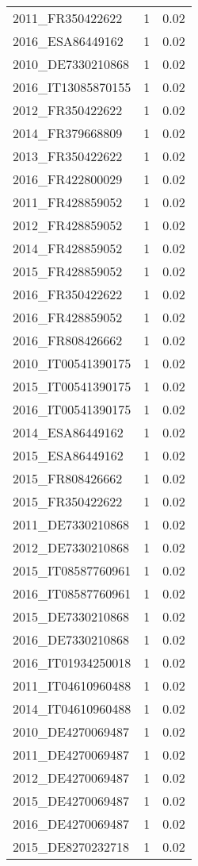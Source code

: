 \begin{table*}[htbp]
\begin{tabular}{lrr}
2011_FR350422622 & 1 & 0.02 \\
2016_ESA86449162 & 1 & 0.02 \\
2010_DE7330210868 & 1 & 0.02 \\
2016_IT13085870155 & 1 & 0.02 \\
2012_FR350422622 & 1 & 0.02 \\
2014_FR379668809 & 1 & 0.02 \\
2013_FR350422622 & 1 & 0.02 \\
2016_FR422800029 & 1 & 0.02 \\
2011_FR428859052 & 1 & 0.02 \\
2012_FR428859052 & 1 & 0.02 \\
2014_FR428859052 & 1 & 0.02 \\
2015_FR428859052 & 1 & 0.02 \\
2016_FR350422622 & 1 & 0.02 \\
2016_FR428859052 & 1 & 0.02 \\
2016_FR808426662 & 1 & 0.02 \\
2010_IT00541390175 & 1 & 0.02 \\
2015_IT00541390175 & 1 & 0.02 \\
2016_IT00541390175 & 1 & 0.02 \\
2014_ESA86449162 & 1 & 0.02 \\
2015_ESA86449162 & 1 & 0.02 \\
2015_FR808426662 & 1 & 0.02 \\
2015_FR350422622 & 1 & 0.02 \\
2011_DE7330210868 & 1 & 0.02 \\
2012_DE7330210868 & 1 & 0.02 \\
2015_IT08587760961 & 1 & 0.02 \\
2016_IT08587760961 & 1 & 0.02 \\
2015_DE7330210868 & 1 & 0.02 \\
2016_DE7330210868 & 1 & 0.02 \\
2016_IT01934250018 & 1 & 0.02 \\
2011_IT04610960488 & 1 & 0.02 \\
2014_IT04610960488 & 1 & 0.02 \\
2010_DE4270069487 & 1 & 0.02 \\
2011_DE4270069487 & 1 & 0.02 \\
2012_DE4270069487 & 1 & 0.02 \\
2015_DE4270069487 & 1 & 0.02 \\
2016_DE4270069487 & 1 & 0.02 \\
2015_DE8270232718 & 1 & 0.02 \\

\end{tabular}
\end{table*}
